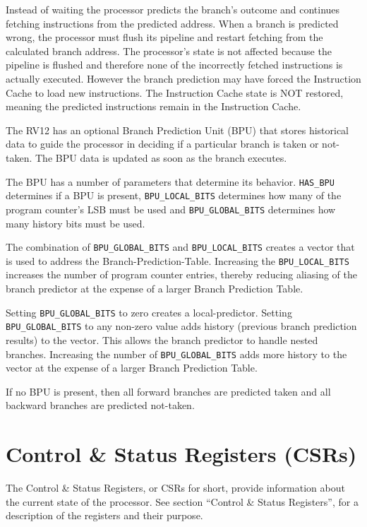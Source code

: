 Instead of waiting the processor predicts the branch's outcome and continues
fetching instructions from the predicted address. When a branch is predicted
wrong, the processor must flush its pipeline and restart fetching from the
calculated branch address.  The processor's state is not affected because the
pipeline is flushed and therefore none of the incorrectly fetched instructions
is actually executed.  However the branch prediction may have forced the
Instruction Cache to load new instructions.  The Instruction Cache state is NOT
restored, meaning the predicted instructions remain in the Instruction Cache.

The RV12 has an optional Branch Prediction Unit (BPU) that stores historical
data to guide the processor in deciding if a particular branch is taken or not-
taken.  The BPU data is updated as soon as the branch executes.

The BPU has a number of parameters that determine its behavior.
\texttt{HAS\_BPU} determines if a BPU is present, \texttt{BPU\_LOCAL\_BITS}
determines how many of the program counter's LSB must be used and
\texttt{BPU\_GLOBAL\_BITS}  determines how many history bits must be used.

The combination of \texttt{BPU\_GLOBAL\_BITS} and \texttt{BPU\_LOCAL\_BITS}
creates a vector that is used to address the Branch-Prediction-Table. Increasing
the \texttt{BPU\_LOCAL\_BITS} increases the number of program counter entries,
thereby reducing aliasing of the branch predictor at the expense of a larger
Branch Prediction Table.

Setting \texttt{BPU\_GLOBAL\_BITS} to zero creates a local-predictor. Setting
\texttt{BPU\_GLOBAL\_BITS} to any non-zero value adds history (previous branch
prediction results) to the vector. This allows the branch predictor to handle
nested branches. Increasing the number of \texttt{BPU\_GLOBAL\_BITS} adds more
history to the vector at the expense of a larger Branch Prediction Table.

If no BPU is present, then all forward branches are predicted taken and
all backward branches are predicted not-taken.

\section{Control \& Status Registers (CSRs)} \label{control-status-registers-csrs}

The Control \& Status Registers, or CSRs for short, provide information
about the current state of the processor. See section ``Control \&
Status Registers'', for a description of the registers and their
purpose.

